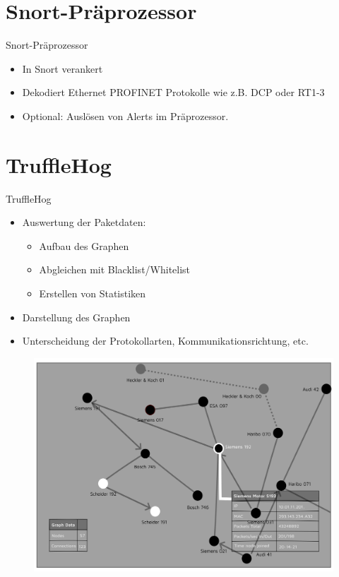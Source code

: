 \documentclass[18pt]{beamer}
\begin{document}
\section{Snort-Präprozessor}
\begin{frame}{Snort-Präprozessor}
    \begin{itemize}
      \item In Snort verankert
      \pause
      \item Dekodiert Ethernet PROFINET Protokolle wie z.B. DCP oder RT1-3
      \pause
      \item Optional: Auslösen von Alerts im Präprozessor.
    \end{itemize}
\end{frame}


\section{TruffleHog}
\begin{frame}{TruffleHog}
    \begin{itemize}
      \item Auswertung der Paketdaten: \pause
      \begin{itemize}
        \item Aufbau des Graphen \pause
        \item Abgleichen mit Blacklist/Whitelist \pause
        \item Erstellen von Statistiken \pause
      \end{itemize}
      
      \item Darstellung des Graphen  \pause
      \item Unterscheidung der Protokollarten, Kommunikationsrichtung, etc.
      
    \end{itemize}
\end{frame}

\begin{frame}
	\begin{figure}
		\includegraphics[height=0.95\textheight]{./images/GUI.png}
	\end{figure}
\end{frame}
\end{document}
